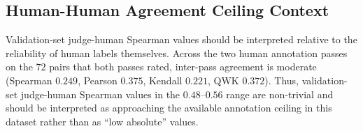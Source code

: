 \begin{table}[t]
  \centering
  \small
   \caption{\textbf{Naive blind baseline vs.\ validation-set labels (0--5 scale).} \(\rho_s\): Spearman, \(r\): Pearson, \(\tau\): Kendall; MAE is absolute error on the 0--5 scale.
  This baseline is included as a sanity-check negative control and is not used for final ranking claims.}
  \label{tab:app-naive-blind-baseline}
\end{table}

\subsection{Human-Human Agreement Ceiling Context}
Validation-set judge-human Spearman values should be interpreted relative to the reliability of human labels themselves.
Across the two human annotation passes on the \(72\) pairs that both passes rated, inter-pass agreement is moderate (Spearman \(0.249\), Pearson \(0.375\), Kendall \(0.221\), QWK \(0.372\)).
Thus, validation-set judge-human Spearman values in the \(0.48\)--\(0.56\) range are non-trivial and should be interpreted as approaching the available annotation ceiling in this dataset rather than as ``low absolute'' values.

